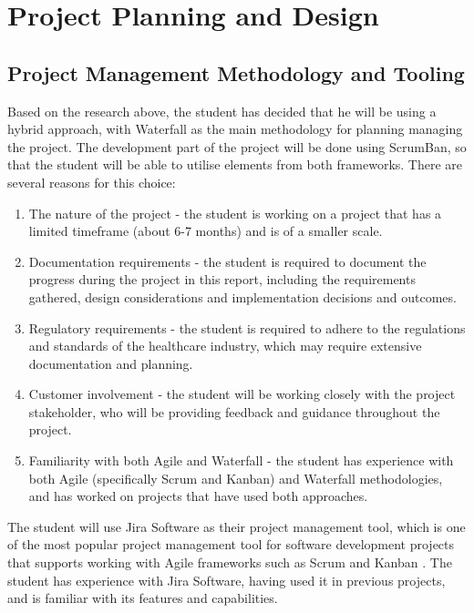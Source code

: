 \chapter{Project Planning and Design}

\section{Project Management Methodology and Tooling}

Based on the research above, the student has decided that he will be using a hybrid approach, with Waterfall as the main methodology for planning managing the project. The development part of the project will be done using ScrumBan, so that the student will be able to utilise elements from both frameworks. There are several reasons for this choice:

\begin{enumerate}
    \item The nature of the project - the student is working on a project that has a limited timeframe (about 6-7 months) and is of a smaller scale. 
    \item Documentation requirements - the student is required to document the progress during the project in this report, including the requirements gathered, design considerations and implementation decisions and outcomes. 
    \item Regulatory requirements - the student is required to adhere to the regulations and standards of the healthcare industry, which may require extensive documentation and planning.
    \item Customer involvement - the student will be working closely with the project stakeholder, who will be providing feedback and guidance throughout the project.
    \item Familiarity with both Agile and Waterfall - the student has experience with both Agile (specifically Scrum and Kanban) and Waterfall methodologies, and has worked on projects that have used both approaches.
\end{enumerate}

The student will use Jira Software as their project management tool, which is one of the most popular project management tool for software development projects that supports working with Agile frameworks such as Scrum and Kanban \parencite{atlassian}. The student has experience with Jira Software, having used it in previous projects, and is familiar with its features and capabilities.


